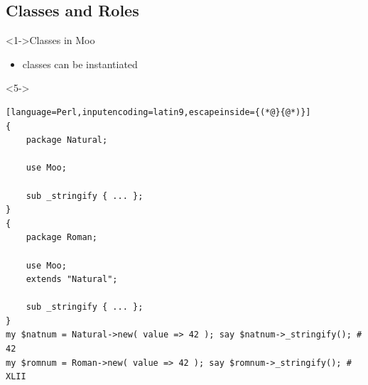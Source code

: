 \documentclass[ngerman,xcolor={table,dvipsnames},smaller,compress,hyperref={bookmarks,colorlinks}]{beamer}
\begin{document}
\subsection{Classes and Roles}

\begin{frame}[t,fragile]

\begin{block}<1->{Classes in Moo}
\begin{itemize}
\item classes can be instantiated
\end{itemize}
\end{block}

\begin{block}<5->{}
\scriptsize
\begin{lstlisting}[language=Perl,inputencoding=latin9,escapeinside={(*@}{@*)}]
{
    package Natural;

    use Moo;

    sub _stringify { ... };
}
{
    package Roman;

    use Moo;
    extends "Natural";

    sub _stringify { ... };
}
my $natnum = Natural->new( value => 42 ); say $natnum->_stringify(); # 42
my $romnum = Roman->new( value => 42 ); say $romnum->_stringify(); # XLII
\end{lstlisting}
\end{block}

\end{frame}
\end{document}
